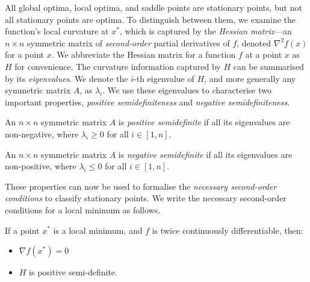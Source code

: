 
All global optima, local optima, and saddle points are stationary points, but not all stationary points are optima. To distinguish between them, we examine the function's local curvature at $x^*$, which is captured by the \textit{Hessian matrix}---an $n \times n$ symmetric matrix of \textit{second-order} partial derivatives of $f$, denoted $\nabla^2 f(x)$ for a point $x$. We abbreviate the Hessian matrix for a function $f$ at a point $x$ as $H$ for convenience. The curvature information captured by $H$ can be summarised by its \textit{eigenvalues}. We denote the $i$-th eigenvalue of $H$, and more generally any symmetric matrix $A$, as $\lambda_i$. We use these eigenvalues to characterise two important properties, \textit{positive semidefiniteness} and \textit{negative semidefiniteness}.



\begin{definition}

    An $n \times n$ symmetric matrix $A$ is \textit{positive semidefinite} if all its eigenvalues are non-negative, where $\lambda_i \geq 0$ for all $i \in [1, n]$.

\end{definition}

\begin{definition}

    An $n \times n$ symmetric matrix $A$ is \textit{negative semidefinite} if all its eigenvalues are non-positive, where $\lambda_i \leq 0$ for all $i \in [1, n]$.

\end{definition}



These properties can now be used to formalise the \textit{necessary second-order conditions} to classify stationary points. We write the necessary second-order conditions for a local minimum as follows.

\begin{definition}

    If a point $x^*$ is a local minimum, and $f$ is twice continuously differentiable, then:

    \begin{itemize}

        \item $\nabla f(x^*) = 0$

        \item $H$ is positive semi-definite.

    \end{itemize}

\end{definition}

